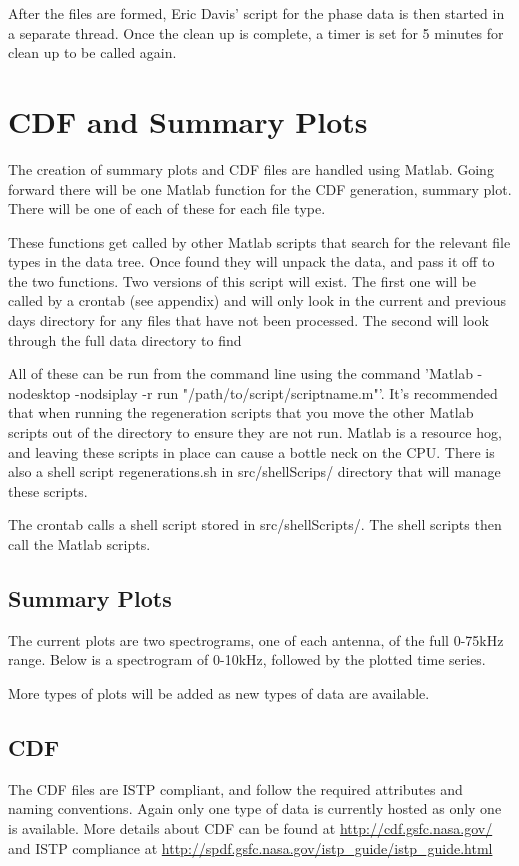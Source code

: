 \documentclass{article}
\begin{document}
After the files are formed, Eric Davis' script for the phase data is then started in a separate thread. Once the clean up is complete, a timer is set for 5 minutes for clean up to be called again.


\section{CDF and Summary Plots}

The creation of summary plots and CDF files are handled using Matlab. Going forward there will be one Matlab function for the CDF generation, summary plot. There will be one of each of these for each file type.

These functions get called by other Matlab scripts that search for the relevant file types in the data tree. Once found they will unpack the data, and pass it off to the two functions. Two versions of this script will exist. The first one will be called by a crontab (see appendix) and will only look in the current and previous days directory for any files that have not been processed. The second will look through the full data directory to find 

All of these can be run from the command line using the command 'Matlab -nodesktop -nodsiplay -r run "/path/to/script/scriptname.m"'. It's recommended that when running the regeneration scripts that you move the other Matlab scripts out of the directory to ensure they are not run. Matlab is a resource hog, and leaving these scripts in place can cause a bottle neck on the CPU. There is also a shell script regenerations.sh in src/shellScrips/ directory that will manage these scripts. 

The crontab calls a shell script stored in src/shellScripts/. The shell scripts then call the Matlab scripts.

\subsection{Summary Plots}
The current plots are two spectrograms, one of each antenna, of the full 0-75kHz range. Below is a spectrogram of 0-10kHz, followed by the plotted time series. 

More types of plots will be added as new types of data are available.
 



\subsection{CDF}
The CDF files are ISTP compliant, and follow the required attributes and naming conventions. Again only one type of data is currently hosted as only one is available. More details about CDF can be found at \url{http://cdf.gsfc.nasa.gov/} and ISTP compliance at \url{http://spdf.gsfc.nasa.gov/istp_guide/istp_guide.html} 
\end{document}
